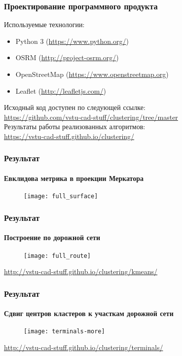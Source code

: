 \begin{frame}
    \frametitle{Проектирование программного продукта}
    \small
    Используемые технологии:
    \begin{itemize}
        \item Python 3 (\url{https://www.python.org/})
        \item OSRM (\url{http://project-osrm.org/})
        \item OpenStreetMap (\url{https://www.openstreetmap.org})
        \item Leaflet (\url{http://leafletjs.com/})
    \end{itemize}
    Исходный код доступен по следующей ссылке:\\
    {\footnotesize\url{https://github.com/vstu-cad-stuff/clustering/tree/master}}\\\vspace{1em}
    Результаты работы реализованных алгоритмов:\\
    \url{https://vstu-cad-stuff.github.io/clustering/}
\end{frame}

\begin{frame}
    \frametitle{Результат}
    \framesubtitle{Евклидова метрика в проекции Меркатора}
    \begin{figure}[ht!]
        \centering
        \texttt{[image: full\_surface]}
    \end{figure}
\end{frame}

\begin{frame}
    \frametitle{Результат}
    \framesubtitle{Построение по дорожной сети}
    \begin{figure}[ht!]
        \centering
        \texttt{[image: full\_route]}
        \vspace*{-1ex}
    \end{figure}
    {\small\url{http://vstu-cad-stuff.github.io/clustering/kmeans/}}
\end{frame}

\begin{frame}
    \frametitle{Результат}
    \framesubtitle{Сдвиг центров кластеров к участкам дорожной сети}
    \begin{figure}[ht!]
        \centering
        \texttt{[image: terminals-more]}
        \vspace*{-1ex}
    \end{figure}
    {\small\url{http://vstu-cad-stuff.github.io/clustering/terminals/}}
\end{frame}

